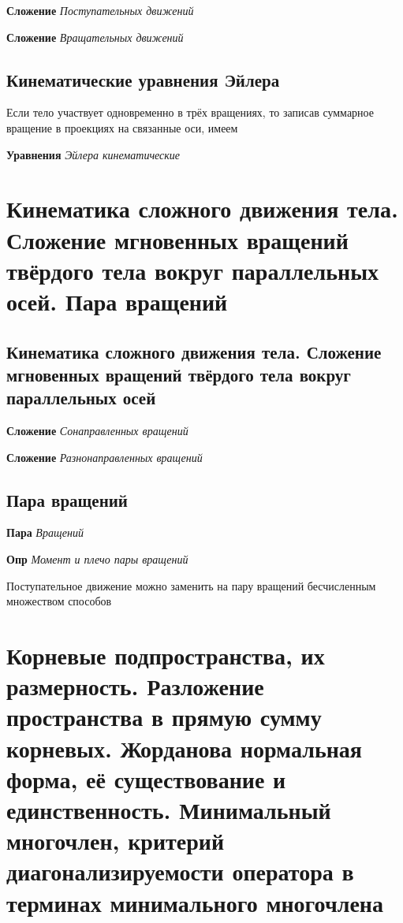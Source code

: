 \documentclass[a4paper, 14pt]{article}
\begin{document}
    \textbf{Сложение} \textit{Поступательных движений}
    
    \textbf{Сложение} \textit{Вращательных движений}
    
    \subsection{Кинематические уравнения Эйлера}
    
    Если тело участвует одновременно в трёх вращениях, то записав суммарное вращение в проекциях на связанные оси, имеем
    
    \textbf{Уравнения} \textit{Эйлера кинематические}
    
    \section{Кинематика сложного движения тела.
    Сложение мгновенных вращений твёрдого тела вокруг параллельных осей.
    Пара вращений}
    
    \subsection{Кинематика сложного движения тела. Сложение мгновенных вращений твёрдого тела вокруг параллельных осей}
    
    \textbf{Сложение} \textit{Сонаправленных вращений}
    
    \textbf{Сложение} \textit{Разнонаправленных вращений}
    
    \subsection{Пара вращений}
    
    \textbf{Пара} \textit{Вращений}
    
    \textbf{Опр} \textit{Момент и плечо пары вращений}
    
    Поступательное движение можно заменить на пару вращений бесчисленным множеством способов
    
    \section{Корневые подпространства, их размерность.
    Разложение пространства в прямую сумму корневых.
    Жорданова нормальная форма, её существование и единственность.
    Минимальный многочлен, критерий диагонализируемости оператора в терминах минимального многочлена}
    
\end{document}
